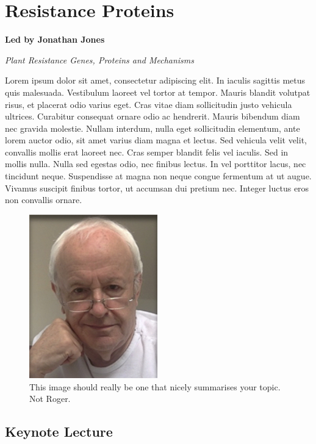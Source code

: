 \documentclass[12pt,]{book}
\begin{document}
\chapter*{Resistance Proteins}\label{resistance-proteins}

\textbf{Led by Jonathan Jones}

\emph{Plant Resistance Genes, Proteins and Mechanisms}

Lorem ipsum dolor sit amet, consectetur adipiscing elit. In iaculis
sagittis metus quis malesuada. Vestibulum laoreet vel tortor at tempor.
Mauris blandit volutpat risus, et placerat odio varius eget. Cras vitae
diam sollicitudin justo vehicula ultrices. Curabitur consequat ornare
odio ac hendrerit. Mauris bibendum diam nec gravida molestie. Nullam
interdum, nulla eget sollicitudin elementum, ante lorem auctor odio, sit
amet varius diam magna et lectus. Sed vehicula velit velit, convallis
mollis erat laoreet nec. Cras semper blandit felis vel iaculis. Sed in
mollis nulla. Nulla sed egestas odio, nec finibus lectus. In vel
porttitor lacus, nec tincidunt neque. Suspendisse at magna non neque
congue fermentum at ut augue. Vivamus suscipit finibus tortor, ut
accumsan dui pretium nec. Integer luctus eros non convallis ornare.

\begin{figure}
\includegraphics[width=2.19in]{assets/RPF-thumbnail} \caption{This image should really be one that nicely summarises your topic. Not Roger.}\label{fig:rpmain}
\end{figure}

\section*{Keynote Lecture}\label{keynote-lecture}
\end{document}
